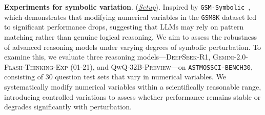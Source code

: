 

\textbf{Experiments for symbolic variation}. (\textit{\underline{Setup}}).
Inspired by \texttt{GSM-Symbolic}~\cite{mirzadeh2024gsm}, which demonstrates that modifying numerical variables in the \texttt{GSM8K} dataset led to significant performance drops, suggesting that LLMs may rely on pattern matching rather than genuine logical reasoning. We aim to assess the robustness of advanced reasoning models under varying degrees of symbolic perturbation.
To examine this, we evaluate three reasoning models—\textsc{DeepSeek-R1}, \textsc{Gemini-2.0-Flash-Thinking-Exp (01-21)}, and \textsc{QwQ-32B-Preview}—on \texttt{ASTMOSSCI-BENCH30}, consisting of 30 question test sets that vary in numerical variables. We systematically modify numerical variables within a scientifically reasonable range, introducing controlled variations to assess whether performance remains stable or degrades significantly with perturbation.

